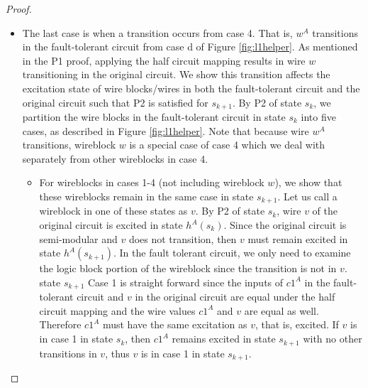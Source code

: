 \documentclass[12pt]{report}
\begin{document}
\begin{proof}
\begin{itemize}
\item The last case is when a transition occurs from case 4.  That is, $w^A$ transitions in the fault-tolerant circuit from case d of Figure \ref{fig:l1helper}.  %
As mentioned in the P1 proof, applying the half circuit mapping results in wire $w$ transitioning in the original circuit.  
We show this transition affects the excitation state of wire blocks/wires in both the fault-tolerant circuit and the original circuit such that P2 is satisfied for $s_{k+1}$.  By P2 of state $s_k$, we partition the wire blocks in the fault-tolerant circuit in state $s_k$ into five cases, as described in Figure \ref{fig:l1helper}.  Note that because wire $w^A$ transitions, wireblock $w$ is a special case of case 4 which we deal with separately from other wireblocks in case 4.
\begin{itemize}
\item
For wireblocks in cases 1-4 (not including wireblock $w$), we show that these wireblocks remain in the same case in state $s_{k+1}$.  Let us call a wireblock in one of these states as $v$.  By P2 of state $s_k$, wire $v$ of the original circuit is excited in state $h^A(s_{k})$.  Since the original circuit is semi-modular and $v$ does not transition, then $v$ must remain excited in state $h^A(s_{k+1})$.  In the fault tolerant circuit, we only need to examine the logic block portion of the wireblock since the transition is not in $v$.  \\
state $s_{k+1}$ Case 1 is straight forward since the inputs of $c1^A$ in the fault-tolerant circuit and $v$ in the original circuit are equal under the half circuit mapping and the wire values $c1^A$ and $v$ are equal as well.  Therefore $c1^A$ must have the same excitation as $v$, that is, excited.  If $v$ is in case 1 in state $s_k$, then $c1^A$ remains excited in state $s_{k+1}$ with no other transitions in $v$, thus $v$ is in case 1 in state $s_{k+1}$.  \\

\end{itemize}
\end{itemize}
\end{proof}
\end{document}
